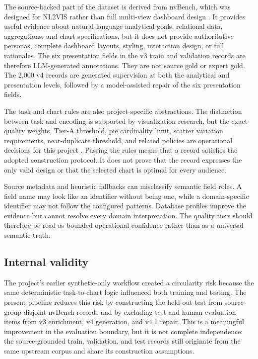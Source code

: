 The source-backed part of the dataset is derived from nvBench, which was designed for NL2VIS rather than full multi-view dashboard design \cite{luo2021nvbenchdataset,luo2021nvbenchsigmod}. It provides useful evidence about natural-language analytical goals, relational data, aggregations, and chart specifications, but it does not provide authoritative personas, complete dashboard layouts, styling, interaction design, or full rationales. The six presentation fields in the v3 train and validation records are therefore LLM-generated annotations. They are not source gold or expert gold. The 2,000 v4 records are generated supervision at both the analytical and presentation levels, followed by a model-assisted repair of the six presentation fields.

The task and chart rules are also project-specific abstractions. The distinction between task and encoding is supported by visualization research, but the exact quality weights, Tier-A threshold, pie cardinality limit, scatter variation requirements, near-duplicate threshold, and related policies are operational decisions for this project \cite{cleveland1984graphical,mackinlay1986apt,brehmer2013typology}. Passing the rules means that a record satisfies the adopted construction protocol. It does not prove that the record expresses the only valid design or that the selected chart is optimal for every audience.

Source metadata and heuristic fallbacks can misclassify semantic field roles. A field name may look like an identifier without being one, while a domain-specific identifier may not follow the configured patterns. Database profiles improve the evidence but cannot resolve every domain interpretation. The quality tiers should therefore be read as bounded operational confidence rather than as a universal semantic truth.

\subsection{Internal validity}

The project's earlier synthetic-only workflow created a circularity risk because the same deterministic task-to-chart logic influenced both training and testing. The present pipeline reduces this risk by constructing the held-out test from source-group-disjoint nvBench records and by excluding test and human-evaluation items from v3 enrichment, v4 generation, and v4.1 repair. This is a meaningful improvement in the evaluation boundary, but it is not complete independence: the source-grounded train, validation, and test records still originate from the same upstream corpus and share its construction assumptions.

